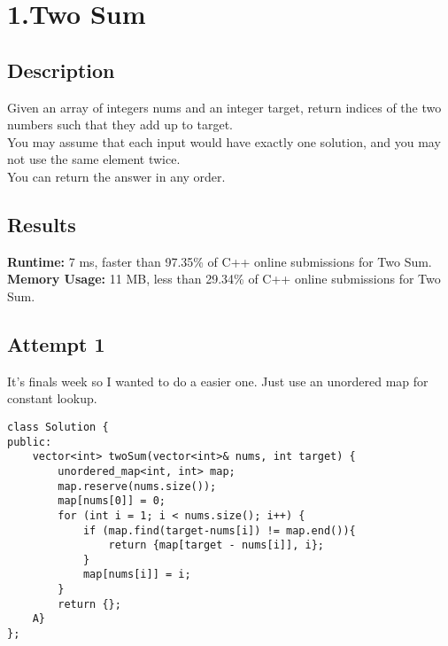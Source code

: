 \chapter{1.Two Sum}
\section{Description}
Given an array of integers nums and an integer target, return indices of the two numbers such that they add up to target.
\\
You may assume that each input would have exactly one solution, and you may not use the same element twice.
\\
You can return the answer in any order.
\section{Results}
\textbf{Runtime:}
7 ms, faster than 97.35\% of C++ online submissions for Two Sum.\\
\textbf{Memory Usage:}
11 MB, less than 29.34\% of C++ online submissions for Two Sum.\\
\newpage
\section{Attempt 1}
It's finals week so I wanted to do a easier one. Just use an unordered map for constant lookup.
\begin{lstlisting}
class Solution {
public:
    vector<int> twoSum(vector<int>& nums, int target) {
        unordered_map<int, int> map;
        map.reserve(nums.size());
        map[nums[0]] = 0;
        for (int i = 1; i < nums.size(); i++) {
            if (map.find(target-nums[i]) != map.end()){
                return {map[target - nums[i]], i};
            }
            map[nums[i]] = i;
        }
        return {};
    A}
};
\end{lstlisting}
